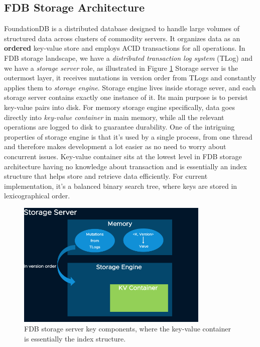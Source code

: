 \documentclass[sigplan,screen,nonacm]{acmart}
\begin{document}
\subsection{FDB Storage Architecture}
FoundationDB \cite{fdb} is a distributed database designed to handle large volumes of structured data across clusters of commodity servers. It organizes data as an \textbf{ordered} key-value store and employs ACID transactions for all operations. In FDB storage landscape, we have a {\itshape distributed transaction log system} (TLog) and we have a {\itshape storage server} role, as illustrated in Figure \ref{fig:FDB-storage-architecture} Storage server is the outermost layer, it receives mutations in version order from TLogs and constantly applies them to {\itshape storage engine}. Storage engine lives inside storage sever, and each storage server contains exactly one instance of it. Its main purpose is to persist key-value pairs into disk. For memory storage engine specifically, data goes directly into {\itshape key-value container} in main memory, while all the relevant operations are logged to disk to guarantee durability. One of the intriguing properties of storage engine is that it’s used by a single process, from one thread and therefore makes development a lot easier as no need to worry about concurrent issues. Key-value container sits at the lowest level in FDB storage architecture having no knowledge about transaction and is essentially an index structure that helps store and retrieve data efficiently. For current implementation, it’s a balanced binary search tree, where keys are stored in lexicographical order. 
\begin{figure}[h]
  \centering
  \includegraphics[width=\linewidth, height=6cm]{pic/FDB-storage-architecture.png}
  \setlength{\abovecaptionskip}{-10pt} 
  \setlength{\belowcaptionskip}{-7pt} 
  \caption{FDB storage server key components, where the key-value container is essentially the index structure.}
  \label{fig:FDB-storage-architecture}
\end{figure}
\end{document}

